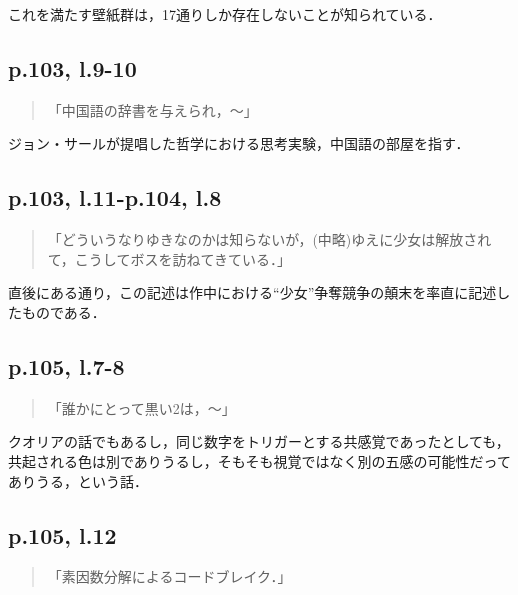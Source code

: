 \documentclass[10pt, a5paper, twoside]{jsarticle}
\theoremstyle{definition}
\begin{document}
			これを満たす壁紙群は，17通りしか存在しないことが知られている\cite{urabe}．

		\subsection{p.103, l.9-10}

			\begin{quote}

				「中国語の辞書を与えられ，〜」
				
			\end{quote}

			ジョン・サールが提唱した哲学における思考実験，中国語の部屋を指す．

		\subsection{p.103, l.11-p.104, l.8}

			\begin{quote}

				「どういうなりゆきなのかは知らないが，(中略)ゆえに少女は解放されて，こうしてボスを訪ねてきている．」
				
			\end{quote}

			直後にある通り，この記述は作中における“少女”争奪競争の顛末を率直に記述したものである．

		\subsection{p.105, l.7-8}

			\begin{quote}

				「誰かにとって黒い2は，〜」

			\end{quote}

			クオリアの話でもあるし，同じ数字をトリガーとする共感覚であったとしても，共起される色は別でありうるし，そもそも視覚ではなく別の五感の可能性だってありうる，という話．

		\subsection{p.105, l.12}

			\begin{quote}

				「素因数分解によるコードブレイク．」
				
			\end{quote}
\end{document}

